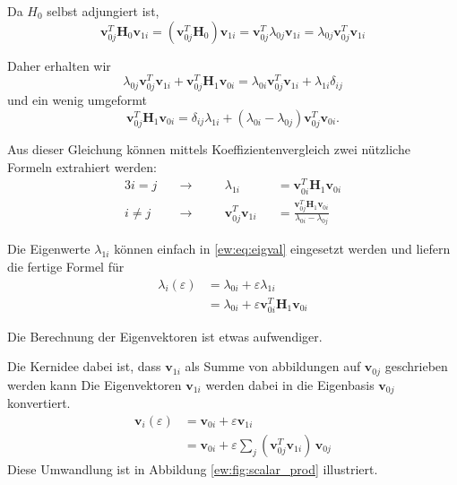 Da $H_0$ selbst adjungiert ist,
\begin{equation}
    \bm v_{0j}^T \bm H_0 \bm v_{1i}
    =
    \left( \bm v_{0j}^T \bm H_0 \right) \bm v_{1i}
    =
    \bm v_{0j}^T \lambda_{0j} \bm v_{1i}
    =
    \lambda_{0j} \bm v_{0j}^T \bm v_{1i}
\end{equation}

Daher erhalten wir
\begin{equation}
    \lambda_{0j} \bm v_{0j}^T \bm v_{1i} + 
    \bm v_{0j}^T \bm H_1 \bm v_{0i}
    =
    \lambda_{0i} \bm v_{0j}^T \bm v_{1i} +
    \lambda_{1i} \delta_{ij}
\end{equation}
und ein wenig umgeformt
\begin{equation}
    \bm v_{0j}^T \bm H_1 \bm v_{0i}
    =
    \delta_{ij} \lambda_{1i} + 
    ( \lambda_{0i} - \lambda_{0j} )
    \bm v_{0j}^T  \bm v_{0i} .
\end{equation} \label{ew:eq:f}

Aus dieser Gleichung können mittels Koeffizientenvergleich zwei nützliche Formeln extrahiert werden:
\begin{alignat}{3}
    i = j \quad & \rightarrow  \quad && \lambda_{1i}&& = \bm v_{0i}^T \bm H_1 \bm v_{0i} \\
    i \neq j \quad & \rightarrow \quad && \bm v_{0j}^T \bm v_{1i}&& = \frac{\bm v_{0j}^T \bm H_1 \bm v_{0i}}{\lambda_{0i} - \lambda_{0j}} 
\end{alignat} \label{ew:eq:f2}

Die Eigenwerte $\lambda_{1i}$ können einfach in \ref{ew:eq:eigval} eingesetzt werden und liefern die fertige Formel für   
\begin{align*}
    \lambda_i(\varepsilon)
    &=
    \lambda_{0i} + \varepsilon \lambda_{1i} \\
    &=
    \lambda_{0i} + \varepsilon \bm v_{0i}^T \bm H_1 \bm v_{0i}
\end{align*}

Die Berechnung der Eigenvektoren ist etwas aufwendiger.


Die Kernidee dabei ist, dass $\bm v_{1i}$ als Summe von abbildungen auf $\bm v_{0j}$ geschrieben werden kann
Die Eigenvektoren $\bm v_{1i}$ werden dabei in die Eigenbasis $\bm v_{0j}$ konvertiert. %
\begin{align*}
    \bm v_i(\varepsilon)
    &=
    \bm v_{0i} + \varepsilon \bm v_{1i} \\
    &=
    \bm v_{0i} + \varepsilon \sum_{j} ( \bm v_{0j}^T \bm v_{1i}) \, \bm v_{0j}
\end{align*}
Diese Umwandlung ist in Abbildung \ref{ew:fig:scalar_prod} illustriert.

